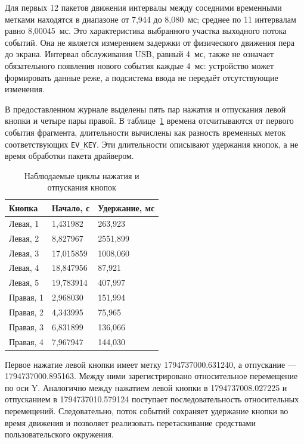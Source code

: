 Для первых 12 пакетов движения интервалы между соседними временными метками находятся в диапазоне от 7,944 до 8,080~мс; среднее по 11 интервалам равно 8,00045~мс. Это характеристика выбранного участка выходного потока событий. Она не является измерением задержки от физического движения пера до экрана. Интервал обслуживания USB, равный 4~мс, также не означает обязательного появления нового события каждые 4~мс: устройство может формировать данные реже, а подсистема ввода не передаёт отсутствующие изменения.

В предоставленном журнале выделены пять пар нажатия и отпускания левой кнопки и четыре пары правой. В таблице~\ref{tab:button-observed} времена отсчитываются от первого события фрагмента, длительности вычислены как разность временных меток соответствующих \texttt{EV\_KEY}. Эти длительности описывают удержания кнопок, а не время обработки пакета драйвером.

\begin{table}[htbp]
\caption{Наблюдаемые циклы нажатия и отпускания кнопок}
\label{tab:button-observed}
\centering\small
\begin{tabular}{|p{}|p{}|p{}|}\hline
Кнопка & Начало, с & Удержание, мс \\ \hline
Левая, 1 & 1,431982 & 263,923 \\ \hline
Левая, 2 & 8,827967 & 2551,899 \\ \hline
Левая, 3 & 17,015859 & 1008,060 \\ \hline
Левая, 4 & 18,847956 & 87,921 \\ \hline
Левая, 5 & 19,783914 & 407,997 \\ \hline
Правая, 1 & 2,968030 & 151,994 \\ \hline
Правая, 2 & 4,343995 & 75,965 \\ \hline
Правая, 3 & 6,831899 & 136,066 \\ \hline
Правая, 4 & 7,967947 & 144,030 \\ \hline
\end{tabular}
\end{table}

Первое нажатие левой кнопки имеет метку 1794737000.631240, а отпускание --- 1794737000.895163. Между ними зарегистрировано относительное перемещение по оси Y. Аналогично между нажатием левой кнопки в 1794737008.027225 и отпусканием в 1794737010.579124 поступает последовательность относительных перемещений. Следовательно, поток событий сохраняет удержание кнопки во время движения и позволяет реализовать перетаскивание средствами пользовательского окружения.


